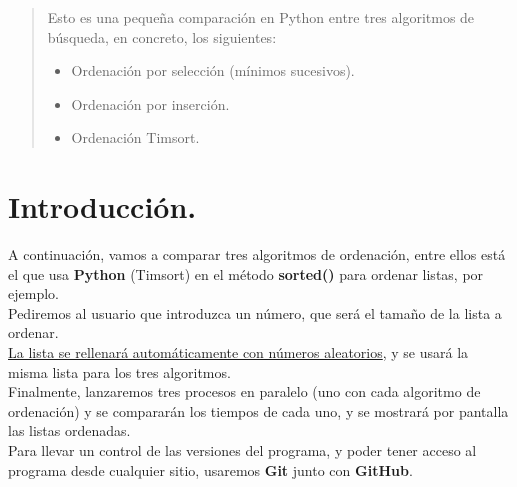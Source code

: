 \documentclass[a4,12pt]{article}
\begin{document}
	
	
		
	
	
	\tableofcontents
	
		\begin{abstract}
			Esto es una pequeña comparación en Python entre tres algoritmos de búsqueda, en concreto, los siguientes:
			\begin{itemize}
				\item Ordenación por selección (mínimos sucesivos).
				\item Ordenación por inserción.
				\item Ordenación Timsort.
			\end{itemize}
		\end{abstract}
	
	\newpage
	
	\section{Introducción.}
	
	A continuación, vamos a comparar tres algoritmos de ordenación, entre ellos está el que usa \textbf{Python} (Timsort) en el método \textbf{sorted()} para ordenar listas, por ejemplo.\\
	
	Pediremos al usuario que introduzca un número, que será el tamaño de la lista a ordenar.\\
	
	\underline{La lista se rellenará automáticamente con números aleatorios}, y se usará la misma lista para los tres algoritmos.\\
	
	Finalmente, lanzaremos tres procesos en paralelo (uno con cada algoritmo de ordenación) y se compararán los tiempos de cada uno, y se mostrará por pantalla las listas ordenadas.\\
	
	Para llevar un control de las versiones del programa, y poder tener acceso al programa desde cualquier sitio, usaremos \textbf{Git} junto con \textbf{GitHub}.
	
\end{document}
